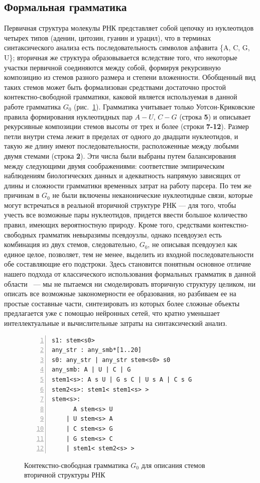 \subsection{Формальная грамматика}
Первичная структура молекулы РНК представляет собой цепочку из нуклеотидов четырех типов (аденин, цитозин, гуанин и урацил), что в терминах синтаксического анализа есть последовательность символов алфавита \{A, C, G, U\}; вторичная же структура образовывается вследствие того, что некоторые участки первичной соединяются между собой, формируя рекурсивную композицию из стемов разного размера и степени вложенности. Обобщенный вид таких стемов может быть формализован средствами достаточно простой контекстно-свободной грамматики, каковой является используемая в данной работе грамматика $G_0$ (рис.~\ref{gram}). Грамматика учитывает только Уотсон-Криковские правила формирования нуклеотидных пар $A-U$, $C-G$ (строка \textbf{5}) и описывает рекурсивные композиции стемов высоты от трех и более (строки \textbf{7-12}). Размер петли внутри стема лежит в пределах от одного до двадцати нуклеотидов, и такую же длину имеют последовательности, расположенные между любыми двумя стемами (строка \textbf{2}). Эти числа были выбраны путем балансирования между следующими двумя соображениями: соответствие эмпирическим наблюдениям биологических данных и адекватность напрямую зависящих от длины и сложности грамматики временных затрат на работу парсера. По тем же причинам в $G_0$ не были включены неканонические нуклеотидные связи, которые могут встречаться в реальной вторичной структуре РНК --- для того, чтобы учесть все возможные пары нуклеотидов, придется ввести большое количество правил, имеющих вероятностную природу. Кроме того, средствами контекстно-свободных грамматик невыразимы псевдоузлы, однако псевдоузел есть комбинация из двух стемов, следовательно, $G_0$, не описывая псевдоузел как единое целое, позволяет, тем не менее, выделить из входной последовательности обе составляющие его подстроки. Здесь становится понятным основное отличие нашего подхода от классического использования формальных грамматик в данной области~\cite{knudsen1999rna,dowell2004evaluation,rivas2000language} --- мы не пытаемся ни смоделировать вторичную структуру целиком, ни описать все возможные закономерности ее образования, но разбиваем ее на простые составные части, синтезировать из которых более сложные объекты предлагается уже с помощью нейронных сетей, что кратно уменьшает интеллектуальные и вычислительные затраты на синтаксический анализ.

\begin{figure}[h]
\begin{Verbatim}[numbers=left,xleftmargin=5mm]
s1: stem<s0>
any_str : any_smb*[1..20]
s0: any_str | any_str stem<s0> s0
any_smb: A | U | C | G
stem1<s>: A s U | G s C | U s A | C s G 
stem2<s>: stem1< stem1<s> >
stem<s>:  
      A stem<s> U 
    | U stem<s> A 
    | C stem<s> G 
    | G stem<s> C 
    | stem1< stem2<s> >  
\end{Verbatim}
\caption{Контекстно-свободная грамматика $G_0$ для описания стемов вторичной структуры РНК}
\label{gram}
\end{figure}


